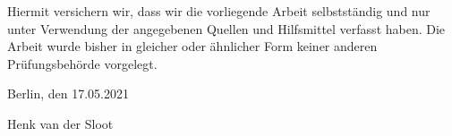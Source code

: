 
Hiermit versichern wir, dass wir die vorliegende Arbeit selbstständig und nur unter Verwendung der angegebenen Quellen und Hilfsmittel verfasst haben. Die Arbeit wurde bisher in gleicher oder ähnlicher Form keiner anderen Prüfungsbehörde vorgelegt.

\vskip 1cm

Berlin, den 17.05.2021

\vskip 1.5cm

Henk van der Sloot
